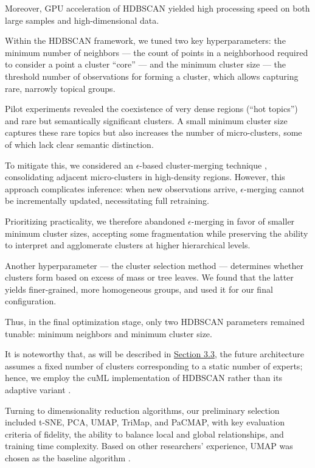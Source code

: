 Moreover, GPU acceleration of HDBSCAN yielded high processing speed on both large samples and high-dimensional data.

Within the HDBSCAN framework, we tuned two key hyperparameters: the minimum number of neighbors --- the count of points
in a neighborhood required to consider a point a cluster “core” --- and the minimum cluster size --- the threshold number
of observations for forming a cluster, which allows capturing rare, narrowly topical groups.

Pilot experiments revealed the coexistence of very dense regions (“hot topics”) and rare but semantically significant
clusters. A small minimum cluster size captures these rare topics but also increases the number of micro-clusters,
some of which lack clear semantic distinction.

To mitigate this, we considered an $\epsilon$-based cluster-merging technique \parencite{HDBSCAN2020cluster_selection_epsilon},
consolidating adjacent micro-clusters in high-density regions. However, this approach complicates inference: when new
observations arrive, $\epsilon$-merging cannot be incrementally updated, necessitating full retraining.

Prioritizing practicality, we therefore abandoned $\epsilon$-merging in favor of smaller minimum cluster sizes, accepting
some fragmentation while preserving the ability to interpret and agglomerate clusters at higher hierarchical levels.

Another hyperparameter --- the cluster selection method --- determines whether clusters form based on excess of mass
or tree leaves. We found that the latter yields finer-grained, more homogeneous groups, and used it for our final
configuration.

Thus, in the final optimization stage, only two HDBSCAN parameters remained tunable: minimum neighbors and minimum cluster
size.

It is noteworthy that, as will be described in \hyperref[sec:architecture]{Section 3.3}, the future architecture assumes
a fixed number of clusters corresponding to a static number of experts; hence, we employ the cuML implementation of HDBSCAN
rather than its adaptive variant \parencite{HDBSCAN2022adaptive}.

Turning to dimensionality reduction algorithms, our preliminary selection included t-SNE, PCA, UMAP, TriMap, and PaCMAP,
with key evaluation criteria of fidelity, the ability to balance local and global relationships, and training time complexity.
Based on other researchers' experience, UMAP was chosen as the baseline algorithm \parencite{BERTopic2022}.

